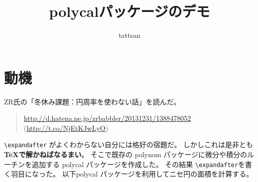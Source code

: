 \documentclass{jsarticle}
\title{\textsf{polycal}パッケージのデモ}\author{tattsan}\date{}
\begin{document}
\maketitle

\section{動機}
ZR氏の「冬休み課題：円周率を使わない話」を読んだ。
\begin{quote}
  \url{http://d.hatena.ne.jp/zrbabbler/20131231/1388478052}
  (\url{http://t.co/NjEtKJwLyO})
\end{quote}
\verb+\expandafter+  がよくわからない自分には格好の宿題だ。
しかしこれは是非とも\textbf{\TeX で解かねばなるまい}。
そこで既存の \textsf{polynom} パッケージに微分や積分のルーチンを追加する
\textsf{polycal} パッケージを作成した。
その結果 \verb|\expandafter|を書く羽目になった。
以下\textsf{polycal} パッケージを利用してニセ円の面積を計算する。
\end{document}
